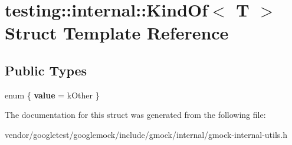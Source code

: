 \hypertarget{structtesting_1_1internal_1_1KindOf}{}\section{testing\+:\+:internal\+:\+:Kind\+Of$<$ T $>$ Struct Template Reference}
\label{structtesting_1_1internal_1_1KindOf}
\subsection*{Public Types}
\begin{DoxyCompactItemize}
\item 
enum \{ {\bfseries value} = k\+Other
 \}\hypertarget{structtesting_1_1internal_1_1KindOf_a4866389a4bc8d5522b5f8ae61a42f520}{}\label{structtesting_1_1internal_1_1KindOf_a4866389a4bc8d5522b5f8ae61a42f520}

\end{DoxyCompactItemize}


The documentation for this struct was generated from the following file\+:\begin{DoxyCompactItemize}
\item 
vendor/googletest/googlemock/include/gmock/internal/gmock-\/internal-\/utils.\+h\end{DoxyCompactItemize}
